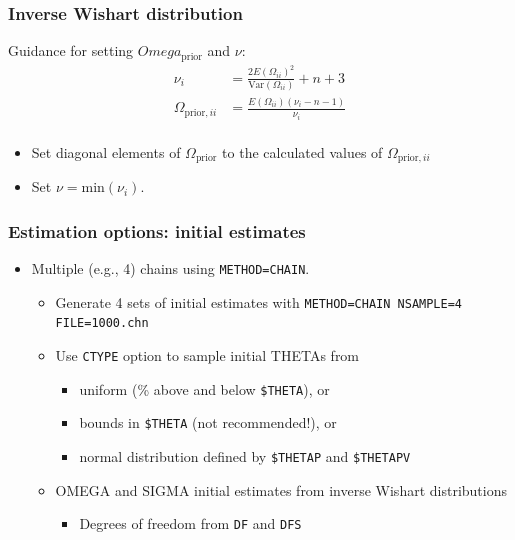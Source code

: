 \documentclass{beamer}
\begin{document}
\begin{frame}
  \frametitle{Inverse Wishart distribution}

Guidance for setting $Omega_\text{prior}$ and $\nu$:
\begin{align*}
  \nu_i &=
  \frac{2E\left(\Omega_{ii}\right)^2}{\text{Var}\left(\Omega_{ii}\right)} + n
  + 3 \\
\Omega_{\text{prior},ii} &= \frac{E\left(\Omega_{ii}\right)\left(\nu_i - n -
                          1\right)}{\nu_i} \\
\end{align*}
\begin{itemize}
\item Set diagonal elements of $\Omega_\text{prior}$ to the calculated values
of $\Omega_{\text{prior},ii}$
\item Set $\nu = \text{min}\left(\nu_i\right)$.
\end{itemize}

\end{frame}

\begin{frame}[fragile]
  \frametitle{Estimation options: initial estimates}

\begin{itemize}
  \item<1-> Multiple (e.g., 4) chains using \verb|METHOD=CHAIN|.
        \begin{itemize}
          \item<2-> Generate 4 sets of initial estimates with \verb|METHOD=CHAIN NSAMPLE=4 FILE=1000.chn|
          \item<3-> Use \verb|CTYPE| option to sample initial THETAs from
                \begin{itemize}
                  \item uniform (\% above and below \verb|$THETA|), or
                  \item bounds in \verb|$THETA| (not recommended!), or
                  \item normal distribution defined by \verb|$THETAP| and \verb|$THETAPV|
                \end{itemize}
          \item<4-> OMEGA and SIGMA initial estimates from inverse Wishart distributions
                \begin{itemize}
                  \item Degrees of freedom from \verb|DF| and \verb|DFS|
                \end{itemize}
        \end{itemize}
\end{itemize}

\end{frame}
\end{document}
